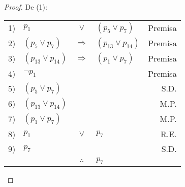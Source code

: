 \documentclass[12pt]{report}
\theoremstyle{largebreak}
\begin{document}
    \begin{proof}
        De (1):
        \begin{center}
            \begin{tabular}{l l c l r}
                1) & $p_1$ & $\lor$ & $(p_5\lor p_7)$ & Premisa \\
                2) & $(p_5\lor p_7)$ & $\Rightarrow$ & $(p_{13}\lor p_{14})$ & Premisa \\
                3) & $(p_{13}\lor p_{14})$ & $\Rightarrow$ & $(p_{1}\lor p_{7})$ & Premisa \\
                4) & $\neg p_1$ &  &  & Premisa \\
                5) & $(p_5\lor p_7)$ &  &  & S.D. \\
                6) & $(p_{13}\lor p_{14})$ &  &  & M.P.\\
                7) & $(p_{1}\lor p_{7})$ &  &  & M.P.\\
                8) & $p_{1}$ & $\lor$ & $p_{7}$ & R.E.\\
                9) & $p_{7}$ &  &  & S.D.\\
                \hline
                & & $\therefore$ & $p_7$ & \\
            \end{tabular}
        \end{center}


\end{proof}
\end{document}
